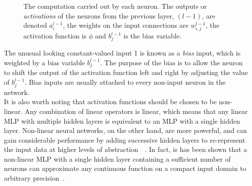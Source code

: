 \documentclass[a4paper, 12pt]{report}
\newcommand{\tit}[1]{\textit{#1}}
\begin{document}
\begin{figure}[h]
\captionsetup{justification=centering}
\begin{center}
\caption{The computation carried out by each neuron. The outputs or \tit{activations} of the neurons from the previous layer, $(l - 1)$, are denoted $a_i^{l-1}$, the weights on the input connections are $w_{i,j}^{l-1}$, the activation function is $\phi$ and $b_j^{l - 1}$ is the bias variable.}
\label{fig:neuron}
\end{center}
\end{figure}

The unusual looking constant-valued input 1 is known as a \tit{bias} input, which is weighted by a bias variable $b_j^{l - 1}$. The purpose of the bias is to allow the neuron to shift the output of the activation function left and right by adjusting the value of $b_j^{l - 1}$. Bias inputs are usually attached to every non-input neuron in the network. \\

It is also worth noting that activation functions should be chosen to be non-linear. Any combination of linear operators is linear, which means that any linear MLP with multiple hidden layers is equivalent to an MLP with a single hidden layer. Non-linear neural networks, on the other hand, are more powerful, and can gain considerable performance by adding successive hidden layers to re-represent the input data at higher levels of abstraction~\cite{dbn:hinton2006}~\cite{scaling:bengio2007}. In fact, is has been shown that a non-linear MLP with a single hidden layer containing a sufficient number of neurons can approximate any continuous function on a compact input domain to arbitrary precision~\cite{universal_approximators:hornik1989}. \\
\end{document}
